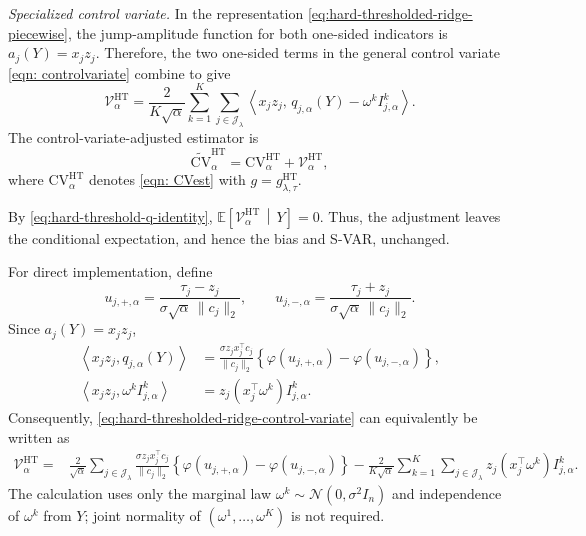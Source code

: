 \documentclass[12pt]{article}
\def\calN{\mathcal{N}}
\newcommand{\tran}{^\intercal}
\theoremstyle{general}
\newcommand{\cv}{{\mathrm{CV}}}
\begin{document}
\medskip\noindent
\emph{Specialized control variate.}
In the representation
\eqref{eq:hard-thresholded-ridge-piecewise}, the jump-amplitude
function for both one-sided indicators is
$a_j(Y)=x_jz_j$.
Therefore, the two one-sided terms in the general control variate
\eqref{eqn: controlvariate} combine to give
\begin{equation}
\label{eq:hard-thresholded-ridge-control-variate}
\mathcal V^{\mathrm{HT}}_{\alpha}
=
\frac{2}{K\sqrt\alpha}
\sum_{k=1}^K
\sum_{j\in\mathcal J_{\lambda}}
\left\langle
x_jz_j,\,
q_{j,\alpha}(Y)-\omega^k I_{j,\alpha}^k
\right\rangle.
\end{equation}
The control-variate-adjusted estimator is
\begin{equation*}
\widetilde{\cv}^{\mathrm{HT}}_{\alpha}
=
\cv^{\mathrm{HT}}_{\alpha}
+
\mathcal V^{\mathrm{HT}}_{\alpha},
\end{equation*}
where \(\cv^{\mathrm{HT}}_{\alpha}\) denotes \eqref{eqn: CVest} with
\(g=g^{\mathrm{HT}}_{\lambda,\tau}\).

By \eqref{eq:hard-threshold-q-identity},
$\mathbb E\left[
\mathcal V^{\mathrm{HT}}_{\alpha}
\,\middle|\,
Y
\right]
=
0$.
Thus, the adjustment leaves the conditional expectation, and hence the
bias and S-VAR, unchanged.

For direct implementation, define
\begin{equation*}
u_{j,+,\alpha}
=
\frac{\tau_j-z_j}
{\sigma\sqrt\alpha\,\|c_j\|_2},
\qquad
u_{j,-,\alpha}
=
\frac{\tau_j+z_j}
{\sigma\sqrt\alpha\,\|c_j\|_2}.
\end{equation*}
Since \(a_j(Y)=x_jz_j\),
\begin{align*}
\left\langle
x_jz_j,q_{j,\alpha}(Y)
\right\rangle
&=
\frac{\sigma z_jx_j\tran c_j}{\|c_j\|_2}
\left\{
\varphi(u_{j,+,\alpha})
-
\varphi(u_{j,-,\alpha})
\right\},
\\
\left\langle
x_jz_j,\omega^kI_{j,\alpha}^k
\right\rangle
&=
z_j(x_j\tran\omega^k)I_{j,\alpha}^k.
\end{align*}
Consequently,
\eqref{eq:hard-thresholded-ridge-control-variate} can equivalently be
written as
\begin{align*}
\mathcal V^{\mathrm{HT}}_{\alpha}
={}&
\frac{2}{\sqrt\alpha}
\sum_{j\in\mathcal J_{\lambda}}
\frac{\sigma z_jx_j\tran c_j}{\|c_j\|_2}
\left\{
\varphi(u_{j,+,\alpha})
-
\varphi(u_{j,-,\alpha})
\right\}
-
\frac{2}{K\sqrt\alpha}
\sum_{k=1}^K
\sum_{j\in\mathcal J_{\lambda}}
z_j(x_j\tran\omega^k)I_{j,\alpha}^k.
\end{align*}
The calculation uses only the marginal law
\(\omega^k\sim\calN(0,\sigma^2I_n)\) and independence of
\(\omega^k\) from \(Y\); joint normality of
\((\omega^1,\ldots,\omega^K)\) is not required.
\end{document}
